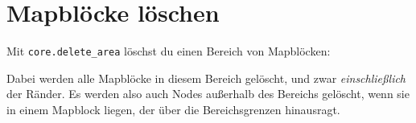 \section{Mapblöcke löschen}\label{mapbluxf6cke-luxf6schen}

Mit
\texttt{core.\allowbreak{}delete\_\allowbreak{}area}
löschst du einen Bereich von Mapblöcken:

\begin{Shaded}
\begin{Highlighting}[]
  \OperatorTok{=} \OperatorTok{\{}  \OperatorTok{=} \OperatorTok{,}  \OperatorTok{=} \OperatorTok{,}  \OperatorTok{=}  \OperatorTok{\}}
  \OperatorTok{=} \OperatorTok{(}\OperatorTok{,} \OperatorTok{)}
  \OperatorTok{=} \OperatorTok{(}\OperatorTok{,} \OperatorTok{)}

\OperatorTok{(}\OperatorTok{,} \OperatorTok{)}
\end{Highlighting}
\end{Shaded}

Dabei werden alle Mapblöcke in diesem Bereich gelöscht, und zwar
\emph{einschließlich} der Ränder. Es werden also auch Nodes außerhalb
des Bereichs gelöscht, wenn sie in einem Mapblock liegen, der über die
Bereichsgrenzen hinausragt.
